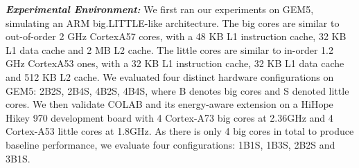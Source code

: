 
\textbf{\textit{Experimental Environment:}} We first ran our experiments on GEM5, simulating an ARM big.LITTLE-like architecture. The big cores are similar to out-of-order 2 GHz CortexA57 cores, with a 48 KB L1 instruction cache, 32 KB L1 data cache and 2 MB L2 cache. The little cores are similar to in-order 1.2 GHz CortexA53 ones, with a 32 KB L1 instruction cache, 32 KB L1 data cache and 512 KB L2 cache. We evaluated four distinct hardware configurations on GEM5: 2B2S, 2B4S, 4B2S, 4B4S, where B denotes big cores and S denoted little cores.
We then validate COLAB and its energy-aware extension on a HiHope Hikey 970 development board with 4 Cortex-A73 big cores at 2.36GHz and 4 Cortex-A53 little cores at 1.8GHz. As there is only 4 big cores in total to produce baseline performance, we evaluate four configurations: 1B1S, 1B3S, 2B2S and 3B1S. 


